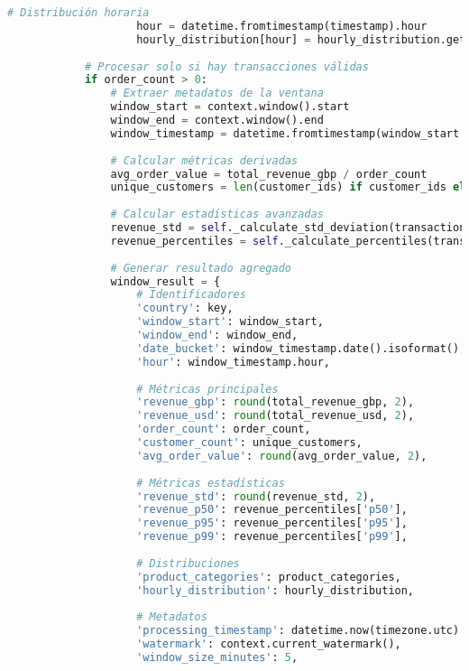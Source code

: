 \begin{lstlisting}[language=python, caption=Implementación de Procesamiento por Ventanas en PyFlink, label=lst:flink_windowing]
                    # Distribución horaria
                    hour = datetime.fromtimestamp(timestamp).hour
                    hourly_distribution[hour] = hourly_distribution.get(hour, 0) + 1
            
            # Procesar solo si hay transacciones válidas
            if order_count > 0:
                # Extraer metadatos de la ventana
                window_start = context.window().start
                window_end = context.window().end
                window_timestamp = datetime.fromtimestamp(window_start / 1000, tz=timezone.utc)
                
                # Calcular métricas derivadas
                avg_order_value = total_revenue_gbp / order_count
                unique_customers = len(customer_ids) if customer_ids else 1
                
                # Calcular estadísticas avanzadas
                revenue_std = self._calculate_std_deviation(transaction_amounts)
                revenue_percentiles = self._calculate_percentiles(transaction_amounts)
                
                # Generar resultado agregado
                window_result = {
                    # Identificadores
                    'country': key,
                    'window_start': window_start,
                    'window_end': window_end,
                    'date_bucket': window_timestamp.date().isoformat(),
                    'hour': window_timestamp.hour,
                    
                    # Métricas principales
                    'revenue_gbp': round(total_revenue_gbp, 2),
                    'revenue_usd': round(total_revenue_usd, 2),
                    'order_count': order_count,
                    'customer_count': unique_customers,
                    'avg_order_value': round(avg_order_value, 2),
                    
                    # Métricas estadísticas
                    'revenue_std': round(revenue_std, 2),
                    'revenue_p50': revenue_percentiles['p50'],
                    'revenue_p95': revenue_percentiles['p95'],
                    'revenue_p99': revenue_percentiles['p99'],
                    
                    # Distribuciones
                    'product_categories': product_categories,
                    'hourly_distribution': hourly_distribution,
                    
                    # Metadatos
                    'processing_timestamp': datetime.now(timezone.utc).timestamp(),
                    'watermark': context.current_watermark(),
                    'window_size_minutes': 5,
                    

\end{lstlisting}
